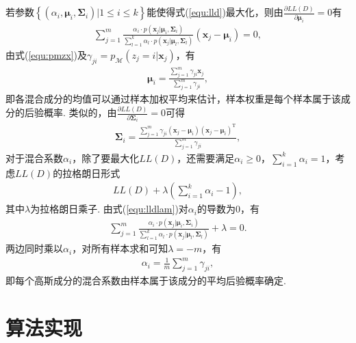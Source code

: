 \documentclass{hitreport}
\begin{document}
若参数$\left\{\left(\alpha_i, \boldsymbol{\mu}_i, \boldsymbol{\Sigma}_i\right)|1\le i\le k\right\}$能使得式(\ref{equ:lld})最大化，则由$\frac{\partial LL\left(D\right)}{\partial\boldsymbol{\mu}_i} = 0$有
\begin{align}
\sum\limits_{j=1}^{m}\frac{\alpha_i\cdot p\left(\boldsymbol{x}_j|\boldsymbol{\mu}_i,\boldsymbol{\Sigma}_i\right)}{\sum\limits_{l=1}^{k}\alpha_l\cdot p\left(\boldsymbol{x}_j|\boldsymbol{\mu}_l,\boldsymbol{\Sigma}_l\right)}\left(\boldsymbol{x}_j-\boldsymbol{\mu}_i\right) = 0,
\end{align}
由式(\ref{equ:pmzx})及$\gamma_{ji} = p_{\mathcal{M}}\left(z_j = i|\boldsymbol{x}_j\right)$，有
\begin{align}
\boldsymbol{\mu}_i = \frac{\sum\limits_{j=1}^{m}\gamma_{ji}\boldsymbol{x}_j}{\sum\limits_{j=1}^{m}\gamma_{ji}},
\end{align}
即各混合成分的均值可以通过样本加权平均来估计，样本权重是每个样本属于该成分的后验概率. 类似的，由$\frac{\partial LL\left(D\right)}{\partial \boldsymbol{\Sigma}_i} = 0$可得
\begin{align}
\boldsymbol{\Sigma}_i = \frac{\sum\limits_{j=1}^{m}\gamma_{ji}\left(\boldsymbol{x}_j-\boldsymbol{\mu}_i\right)\left(\boldsymbol{x}_j - \boldsymbol{\mu}_i\right)^{\text{T}}}{\sum\limits_{j=1}^{m}\gamma_{ji}},
\end{align}
对于混合系数$\alpha_i$，除了要最大化$LL\left(D\right)$，还需要满足$\alpha_i\ge 0$，$\sum_{i=1}^{k}\alpha_i=1$，考虑$LL\left(D\right)$的拉格朗日形式
\begin{align}\label{equ:lldlam}
LL\left(D\right) + \lambda\left(\sum_{i=1}^{k}\alpha_i-1\right),
\end{align}
其中$\lambda$为拉格朗日乘子. 由式(\ref{equ:lldlam})对$\alpha_i$的导数为0，有
\begin{align}
\sum\limits_{j=1}^{m}\frac{\alpha_i\cdot p\left(\boldsymbol{x}_j|\boldsymbol{\mu}_i,\boldsymbol{\Sigma}_i\right)}{\sum\limits_{l=1}^{k}\alpha_l\cdot p\left(\boldsymbol{x}_j|\boldsymbol{\mu}_l,\boldsymbol{\Sigma}_l\right)}+\lambda = 0.
\end{align}
两边同时乘以$\alpha_i$，对所有样本求和可知$\lambda = -m$，有
\begin{align}
\alpha_i = \frac{1}{m}\sum_{j=1}^{m}\gamma_{ji},
\end{align}
即每个高斯成分的混合系数由样本属于该成分的平均后验概率确定. 



\section{算法实现}
\end{document}

